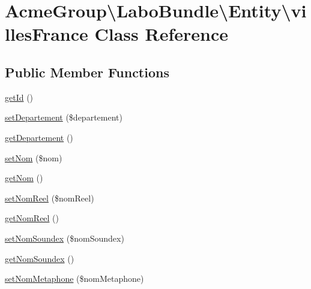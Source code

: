 \hypertarget{class_acme_group_1_1_labo_bundle_1_1_entity_1_1villes_france}{\section{Acme\+Group\textbackslash{}Labo\+Bundle\textbackslash{}Entity\textbackslash{}villes\+France Class Reference}
\label{class_acme_group_1_1_labo_bundle_1_1_entity_1_1villes_france}
}
\subsection*{Public Member Functions}
\begin{DoxyCompactItemize}
\item 
\hyperlink{class_acme_group_1_1_labo_bundle_1_1_entity_1_1villes_france_a1db8709e077754a31fc2884745b87316}{get\+Id} ()
\item 
\hyperlink{class_acme_group_1_1_labo_bundle_1_1_entity_1_1villes_france_a50aa2dd8fe6b8ef635811957506c31b4}{set\+Departement} (\$departement)
\item 
\hyperlink{class_acme_group_1_1_labo_bundle_1_1_entity_1_1villes_france_a5f986ec1b41350e292f94a6df89165d3}{get\+Departement} ()
\item 
\hyperlink{class_acme_group_1_1_labo_bundle_1_1_entity_1_1villes_france_aa2a95fc2e93ca3d652ef7079b586ffee}{set\+Nom} (\$nom)
\item 
\hyperlink{class_acme_group_1_1_labo_bundle_1_1_entity_1_1villes_france_a9a5707aa44f7f09fa3927bb1b2fe6f92}{get\+Nom} ()
\item 
\hyperlink{class_acme_group_1_1_labo_bundle_1_1_entity_1_1villes_france_a1cad3b4eba63333ad1461da56f11d6a4}{set\+Nom\+Reel} (\$nom\+Reel)
\item 
\hyperlink{class_acme_group_1_1_labo_bundle_1_1_entity_1_1villes_france_a655c1a567844b3730e273a532b21bacc}{get\+Nom\+Reel} ()
\item 
\hyperlink{class_acme_group_1_1_labo_bundle_1_1_entity_1_1villes_france_ac5f4e15bb6236ad2a7f3f8b6cc8797be}{set\+Nom\+Soundex} (\$nom\+Soundex)
\item 
\hyperlink{class_acme_group_1_1_labo_bundle_1_1_entity_1_1villes_france_a37fd949f62f44b7a95b1f383bb843ecd}{get\+Nom\+Soundex} ()
\item 
\hyperlink{class_acme_group_1_1_labo_bundle_1_1_entity_1_1villes_france_a878b829afba07e048a9e45e00ca7f6ee}{set\+Nom\+Metaphone} (\$nom\+Metaphone)

\end{DoxyCompactItemize}
